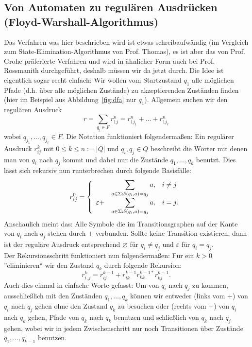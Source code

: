 \documentclass[11pt, a4paper]{article}
\let\emptyset\varnothing
\begin{document}
\subsection*{Von Automaten zu regulären Ausdrücken (Floyd-Warshall-Algorithmus)}
Das Verfahren was hier beschrieben wird ist etwas schreibaufwändig (im Vergleich zum State-Elimination-Algorithmus von Prof. Thomas), es ist aber das von Prof. Grohe präferierte Verfahren und wird in ähnlicher Form auch bei Prof. Rossmanith durchgeführt, deshalb müssen wir da jetzt durch. Die Idee ist eigentlich sogar recht einfach: Wir wollen vom Startzustand \( q_1 \) alle möglichen Pfade (d.h. über alle möglichen Zustände) zu akzeptierenden Zuständen finden (hier im Beispiel aus Abbildung~\ref{fig:dfa} nur \( q_1 \)). Allgemein suchen wir den regulären Ausdruck
\[
	r = \sum_{q_j \in F} r_{1j}^n = r_{1j_1}^n + \ldots + r_{1j_\ell}^n
\]
wobei \( q_{j_1}, \ldots, q_{j_\ell} \in F \). Die Notation funktioniert folgendermaßen: Ein regulärer Ausdruck \( r_{ij}^k \) mit \( 0 \leq k \leq n := \left| Q \right| \) und \( q_i, q_j \in Q \) beschreibt die Wörter mit denen man von \( q_i \) nach \( q_j \) kommt und dabei nur die Zustände \( q_1, \ldots, q_k \) benutzt. Dies lässt sich rekursiv nun runterbrechen durch folgende Basisfälle:
\[
	r_{ij}^0 = \left\lbrace 
		\begin{array}{*3{>{\displaystyle}l}p{5cm}}
			\ &\sum_{a \in \Sigma: \delta(q_i, a) = q_j} a, & i \neq j\\
			\varepsilon + &\sum_{a \in \Sigma: \delta(q_i, a) = q_j} a, & i = j.
		\end{array}
	\right.	
\]
Anschaulich meint das: Alle Symbole die im Transitionsgraphen auf der Kante von \( q_i \) nach \( q_j \) stehen durch \( + \) verbunden. Sollte keine Transition existieren, dann ist der reguläre Ausdruck entsprechend \( \emptyset \) für \( q_i \neq q_j \) und \( \varepsilon \) für \( q_i = q_j \).\\
Der Rekursionsschritt funktioniert nun folgendermaßen: Für ein \( k > 0 \) ''eliminieren`` wir den Zustand \( q_k \) durch folgende Rekursion:
\[
	r_{i,j}^k = r_{ij}^{k-1} + r_{ik}^{k-1} r_{kk}^{k-1\ast} r_{kj}^{k-1}.
\]
Auch dies einmal in einfache Worte gefasst: Um von \( q_i \) nach \( q_j \) zu kommen, ausschließlich mit den Zuständen \( q_1, \ldots, q_k \) können wir entweder (links vom +) von \( q_i \) nach \( q_j \) gehen ohne den Zustand \( q_k \) zu besuchen oder (rechts vom +) von \( q_i \) nach \( q_k \) gehen, Pfade von \( q_k \) nach \( q_k \) benutzen und schließlich von \( q_k \) nach \( q_j \) gehen, wobei wir in jedem Zwischenschritt nur noch Transitionen über Zustände \( q_1, \ldots, q_{k-1} \) benutzen.\\
\end{document}
